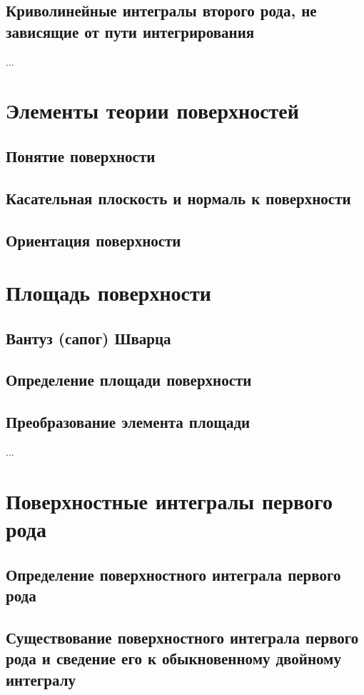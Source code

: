 \subsection{Криволинейные интегралы второго рода, не зависящие от пути интегрирования}
...

\section{Элементы теории поверхностей}
\subsection{Понятие поверхности}

\subsection{Касательная плоскость и нормаль к поверхности}

\subsection{Ориентация поверхности}


\section{Площадь поверхности}
\subsection{Вантуз (сапог) Шварца}
\subsection{Определение площади поверхности}
\subsection{Преобразование элемента площади}
...

\section{Поверхностные интегралы первого рода}
\subsection{Определение поверхностного интеграла первого рода}
\subsection{Существование поверхностного интеграла первого рода и сведение его к обыкновенному двойному интегралу}
